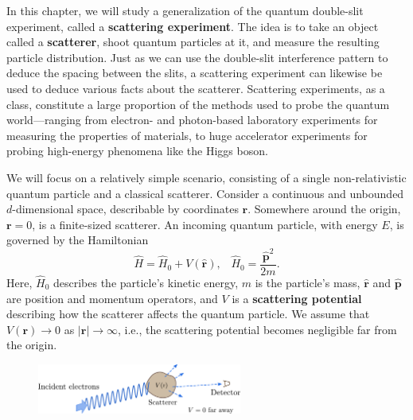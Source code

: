 \documentclass[pra,12pt]{revtex4}
\begin{document}
In this chapter, we will study a generalization of the quantum
double-slit experiment, called a \textbf{scattering experiment}.  The
idea is to take an object called a \textbf{scatterer}, shoot quantum
particles at it, and measure the resulting particle distribution.
Just as we can use the double-slit interference pattern to deduce the
spacing between the slits, a scattering experiment can likewise be
used to deduce various facts about the scatterer.  Scattering
experiments, as a class, constitute a large proportion of the methods
used to probe the quantum world---ranging from electron- and
photon-based laboratory experiments for measuring the properties of
materials, to huge accelerator experiments for probing high-energy
phenomena like the Higgs boson.

We will focus on a relatively simple scenario, consisting of a single
non-relativistic quantum particle and a classical scatterer.  Consider
a continuous and unbounded $d$-dimensional space, describable by
coordinates $\mathbf{r}$.  Somewhere around the origin, $\mathbf{r} =
0$, is a finite-sized scatterer.  An incoming quantum particle, with
energy $E$, is governed by the Hamiltonian
$$\hat{H} = \hat{H}_0 + V(\hat{\mathbf{r}}), \;\;\; \hat{H}_0 = \frac{\hat{\mathbf{p}}^2}{2m}.$$
Here, $\hat{H}_0$ describes the particle's kinetic energy, $m$ is the
particle's mass, $\hat{\mathbf{r}}$ and $\hat{\mathbf{p}}$ are
position and momentum operators, and $V$ is a \textbf{scattering
  potential} describing how the scatterer affects the quantum
particle.  We assume that $V(\mathbf{r}) \rightarrow 0$ as
$|\mathbf{r}| \rightarrow \infty$, i.e., the scattering potential
becomes negligible far from the origin.

\begin{figure}[h]
  \centering\includegraphics[width=0.6\textwidth]{scattering}
\end{figure}
\end{document}
